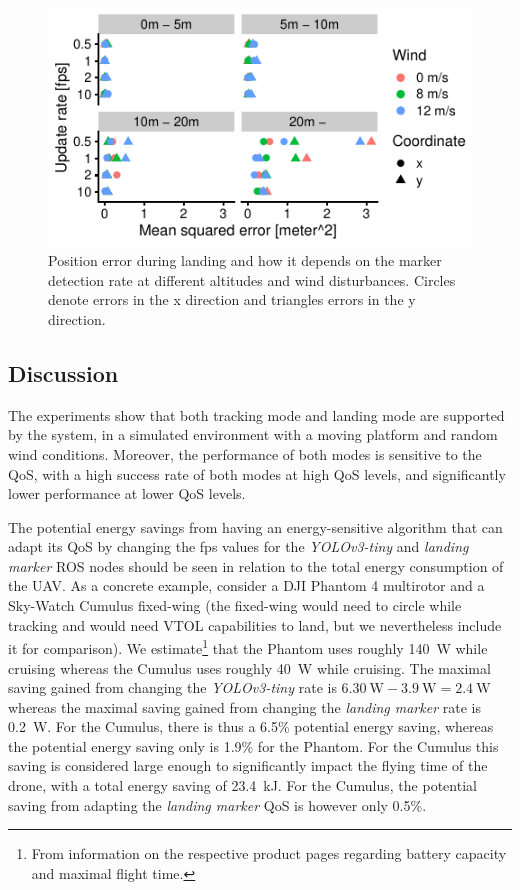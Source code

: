 \documentclass[conference]{IEEEtran}
\begin{document}
\begin{figure}[t]
\centering
\includegraphics{data_visualization/QoSLanding.pdf}
\caption{Position error during landing and how it depends 
on the marker detection rate at different altitudes and wind disturbances.
Circles denote errors in the x direction and triangles 
errors in the y direction.}
\label{fig:PositionErrorDuringLanding}
\end{figure}

\subsection{Discussion}

The experiments show that both tracking mode and landing mode are
supported by the system, in a simulated environment with a moving
platform and random wind conditions. Moreover, the performance of both
modes is sensitive to the QoS, with a high success rate of both modes
at high QoS levels, and significantly lower performance at lower QoS
levels.

The potential energy savings from having an energy-sensitive algorithm
that can adapt its QoS by changing the fps values for the
\emph{YOLOv3-tiny} and \emph{landing marker} ROS nodes should be seen
in relation to the total energy consumption of the UAV. As a concrete
example, consider a DJI Phantom 4 multirotor and a Sky-Watch Cumulus
fixed-wing (the fixed-wing would need to circle while tracking and 
would need VTOL capabilities to land, but we nevertheless include it 
for comparison). We estimate\footnote{From information on the respective
  product pages regarding battery capacity and maximal flight time.}
that the Phantom uses roughly \SI{140}{\watt} while cruising whereas the Cumulus
uses roughly \SI{40}{\watt} while cruising. The maximal saving gained from
changing the \emph{YOLOv3-tiny} rate is 
$\SI{6.30}{\watt}-\SI{3.9}{\watt}=\SI{2.4}{\watt}$ whereas the
maximal saving gained from changing the \emph{landing marker} rate is
\SI{0.2}{\watt}. For the Cumulus, there is thus a 6.5\% potential energy
saving, whereas the potential energy saving only is 1.9\% for the
Phantom. For the Cumulus this saving is considered large enough to
significantly impact the flying time of the drone, with a total energy
saving of \SI{23.4}{\kilo \joule}. For the Cumulus, the potential saving from adapting
the \emph{landing marker} QoS is however only 0.5\%. 
\end{document}
